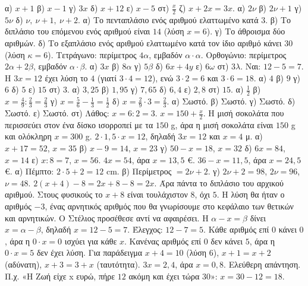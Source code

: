  α) $x+1$ \quad β) $x-1$ \quad γ) $3x$ \quad δ) $x+12$ \quad ε) $x-5$ \quad στ) $\frac{x}{2}$ \quad ζ) $x+2x=3x$.
 α) $2\nu$ \quad β) $2\nu+1$ \quad γ) $5\nu$ \quad δ) $\nu,\ \nu+1,\ \nu+2$.
 α) Το πενταπλάσιο ενός αριθμού ελαττωμένο κατά $3$. \quad β) Το διπλάσιο του επόμενου ενός αριθμού είναι $14$ (λύση $x=6$). \quad γ) Το άθροισμα δύο αριθμών. \quad δ) Το εξαπλάσιο ενός αριθμού ελαττωμένο κατά τον ίδιο αριθμό κάνει $30$ (λύση $\kappa=6$).
 Τετράγωνο: περίμετρος $4\alpha$, εμβαδόν $\alpha\cdot\alpha$. Ορθογώνιο: περίμετρος $2\alpha+2\beta$, εμβαδόν $\alpha\cdot\beta$.
 α) $3x$ \quad β) $8\alpha$ \quad γ) $5\beta$ \quad δ) $6x+4y$ \quad ε) $6\omega$ \quad στ) $3\lambda$.
 Ναι: $12-5=7$. Η $3x=12$ έχει λύση το $4$ (γιατί $3\cdot4=12$), ενώ $3\cdot2=6$ και $3\cdot6=18$.
 α) $4$ \quad β) $9$ \quad γ) $6$ \quad δ) $5$ \quad ε) $15$ \quad στ) $3$.
 α) $3{,}25$ \quad β) $1{,}95$ \quad γ) $7{,}65$ \quad δ) $6{,}4$ \quad ε) $2{,}8$ \quad στ) $15$.
 α) $\frac{1}{2}$ \quad β) $x=\frac{4}{9}:\frac{2}{3}=\frac{2}{3}$ \quad γ) $x=\frac{5}{6}-\frac{1}{3}=\frac{1}{2}$ \quad δ) $x=\frac{2}{9}\cdot3=\frac{2}{3}$.
 α) Σωστό. β) Σωστό. γ) Σωστό. δ) Σωστό. ε) Σωστό. στ) Λάθος: $x=6:2=3$.
 $x=150+\frac{x}{2}$. Η μισή σοκολάτα που περισσεύει στον ένα δίσκο ισορροπεί με τα $150$ g, άρα η μισή σοκολάτα είναι $150$ g και ολόκληρη $x=300$ g.
 $2\cdot1{,}5\cdot x=12$, δηλαδή $3x=12$ και $x=4$ μ.
 α) $x+17=52$, $x=35$ \quad β) $x-9=14$, $x=23$ \quad γ) $50-x=18$, $x=32$ \quad δ) $6x=84$, $x=14$ \quad ε) $x:8=7$, $x=56$.
 $4x=54$, άρα $x=13{,}5$ €.
 $36-x=11{,}5$, άρα $x=24{,}5$ €.
 α) Πέμπτο: $2\cdot5+2=12$ cm. β) Περίμετρος $=2\nu+2$. γ) $2\nu+2=98$, $2\nu=96$, $\nu=48$.
 $2(x+4)-8=2x+8-8=2x$. Άρα πάντα το διπλάσιο του αρχικού αριθμού.
 Στους φυσικούς το $x+8$ είναι τουλάχιστον $8$, όχι $5$. Η λύση θα ήταν ο αριθμός $-3$, ένας αρνητικός αριθμός που θα γνωρίσουμε στο κεφάλαιο των θετικών και αρνητικών.
 Ο Στέλιος προσέθεσε αντί να αφαιρέσει. Η $\alpha-x=\beta$ δίνει $x=\alpha-\beta$, δηλαδή $x=12-5=7$. Έλεγχος: $12-7=5$.
 Κάθε αριθμός επί $0$ κάνει $0$, άρα η $0\cdot x=0$ ισχύει για κάθε $x$. Κανένας αριθμός επί $0$ δεν κάνει $5$, άρα η $0\cdot x=5$ δεν έχει λύση.
 Για παράδειγμα $x+4=10$ (λύση $6$), $x+1=x+2$ (αδύνατη), $x+3=3+x$ (ταυτότητα).
 $3x=2{,}4$, άρα $x=0{,}8$.
 Ελεύθερη απάντηση. Π.χ. «Η Ζωή είχε x ευρώ, πήρε $12$ ακόμη και έχει τώρα $30$»: $x=30-12=18$.
